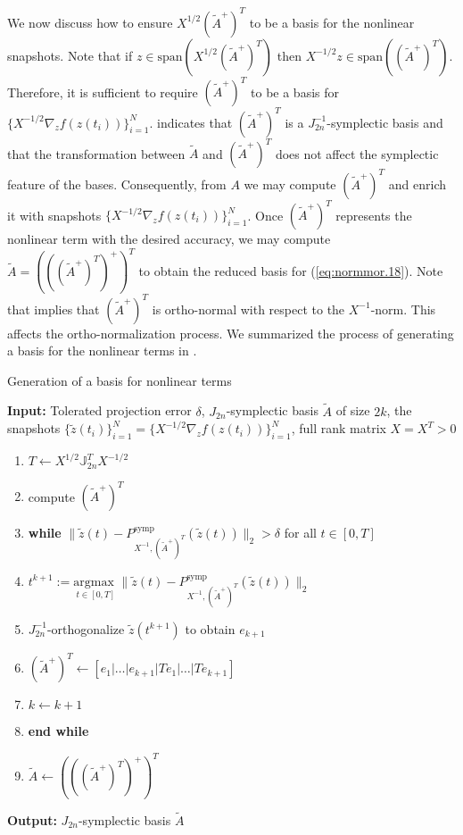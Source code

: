 We now discuss how to ensure $X^{1/2} (\tilde A^+)^T$ to be a basis for the nonlinear snapshots. Note that if $z \in \text{span}\left(X^{1/2} (\tilde A^+)^T\right)$ then $X^{-1/2} z \in \text{span}\left(( \tilde A^+)^T \right)$. Therefore, it is sufficient to require $(\tilde A^+)^T$ to be a basis for $\{X^{-1/2} \nabla_z f(z(t_i))\}_{i=1}^N$.  indicates that $(\tilde A^+)^T$ is a $J_{2n}^{-1}$-symplectic basis and that the transformation between $\tilde A$ and $(\tilde A^+)^T $ does not affect the symplectic feature of the bases. Consequently, from $A$ we may compute $(\tilde A^+)^T$ and enrich it with snapshots $\{X^{-1/2} \nabla_z f(z(t_i))\}_{i=1}^N$. Once $(\tilde A^+)^T$ represents the nonlinear term with the desired accuracy, we may compute $\tilde A= \left( \left( ( \tilde A^+ )^T \right)^+ \right)^T$ to obtain the reduced basis for (\ref{eq:normmor.18}). Note that  implies that $(\tilde A^+)^T$ is ortho-normal with respect to the $X^{-1}$-norm. This affects the ortho-normalization process. We summarized the process of generating a basis for the nonlinear terms in .

\begin{algorithm} 
\caption{Generation of a basis for nonlinear terms} \label{alg:3}
{\bf Input:} Tolerated projection error $\delta$, $J_{2n}$-symplectic basis $\tilde A$ of size $2k$, the snapshots $\{\tilde z(t_i)\}_{i=1}^{N} = \{X^{-1/2} \nabla_zf(z(t_i))\}_{i=1}^{N}$, full rank matrix $X=X^T>0$
\begin{enumerate}
\item $T \leftarrow X^{1/2}\mathbb J_{2n}^T X^{-1/2}$
\item compute $(\tilde A^+)^T$
\item \textbf{while} $\| \tilde z(t) - P^\text{symp}_{X^{-1},(\tilde A^+)^T}( \tilde z(t) ) \|_2 > \delta$ for all $t \in [0,T]$
\item \hspace{0.5cm} $t^{k+1} := \underset{t\in [0,T]}{\text{argmax }} \| \tilde z(t) - P^\text{symp}_{X^{-1},(\tilde A^+)^T}( \tilde z(t) ) \|_2$
\item \hspace{0.5cm} $J_{2n}^{-1}$-orthogonalize $ \tilde z(t^{k+1})$ to obtain $e_{k+1}$
\item \hspace{0.5cm} $(\tilde A^+)^T \leftarrow [e_1|\dots |e_{k+1} | Te_1|\dots| Te_{k+1}]$
\item \hspace{0.5cm} $k \leftarrow k+1$
\item \textbf{end while}
\item $\tilde A \leftarrow \left( \left( ( \tilde A^+ )^T \right)^+ \right)^T$
\end{enumerate}
\vspace{0.5cm}
{\bf Output:} $J_{2n}$-symplectic basis $\tilde A$
\end{algorithm}

